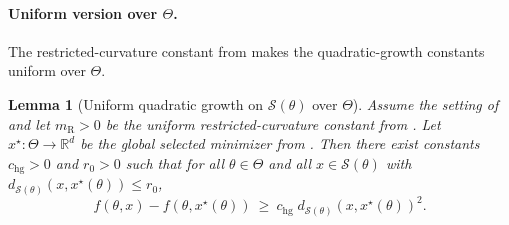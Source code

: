 \documentclass{article}
\theoremstyle{normaltheorem}
\newtheorem{lemma}[lemma]{Lemma}
\newcommand{\R}{\mathbb{R}}
\newcommand{\calS}{\mathcal{S}}
\begin{document}
\paragraph{Uniform version over $\Theta$.}
The restricted-curvature constant from  makes the quadratic-growth constants uniform over
\(\Theta\).

\begin{lemma}[Uniform quadratic growth on $\calS(\theta)$ over $\Theta$]\label{lem:uniform-hg}
Assume the setting of  and let \(m_{\mathrm R}>0\) be the uniform restricted-curvature constant from
.
Let $x^\star:\Theta\to\R^d$ be the global selected minimizer from .
Then there exist constants $c_{\mathrm{hg}}>0$ and $r_0>0$ such that for all $\theta\in\Theta$ and all
$x\in\calS(\theta)$ with $d_{\calS(\theta)}(x,x^\star(\theta))\le r_0$,
\[
f(\theta,x)-f(\theta,x^\star(\theta))
\ \ge\
c_{\mathrm{hg}}\; d_{\calS(\theta)}(x,x^\star(\theta))^2.
\]
\end{lemma}
\end{document}
